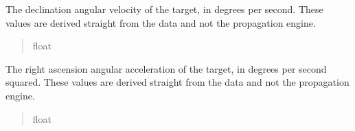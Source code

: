 \documentclass[letterpaper,11pt,english]{sphinxmanual}
\begin{document}
\begin{savenotes}
\begin{fulllineitems}
\begin{savenotes}\begin{fulllineitems}
\label{\detokenize{code/opihiexarata.propagate.solution:opihiexarata.propagate.solution.PropagativeSolution.raw_dec_velocity}}
\pysigstartsignatures
{}
\pysigstopsignatures
\sphinxAtStartPar
The declination angular velocity of the target, in degrees per
second. These values are derived straight from the data and not the
propagation engine.
\begin{quote}\begin{description}
\sphinxAtStartPar
float

\end{description}\end{quote}

\end{fulllineitems}\end{savenotes}


\begin{savenotes}\begin{fulllineitems}
\label{\detokenize{code/opihiexarata.propagate.solution:opihiexarata.propagate.solution.PropagativeSolution.raw_ra_acceleration}}
\pysigstartsignatures
{}
\pysigstopsignatures
\sphinxAtStartPar
The right ascension angular acceleration of the target, in degrees per
second squared. These values are derived straight from the data and
not the propagation engine.
\begin{quote}\begin{description}
\sphinxAtStartPar
float

\end{description}\end{quote}

\end{fulllineitems}\end{savenotes}



\end{fulllineitems}
\end{savenotes}
\end{document}

